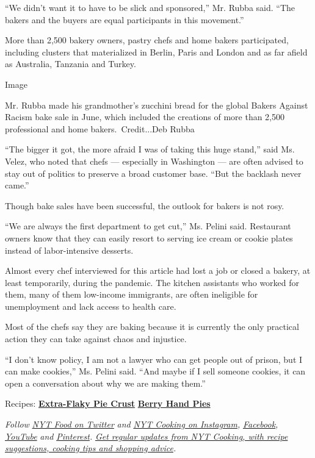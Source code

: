 ``We didn't want it to have to be slick and sponsored,'' Mr. Rubba said.
``The bakers and the buyers are equal participants in this movement.''

More than 2,500 bakery owners, pastry chefs and home bakers
participated, including clusters that materialized in Berlin, Paris and
London and as far afield as Australia, Tanzania and Turkey.

Image

Mr. Rubba made his grandmother's zucchini bread for the global Bakers
Against Racism bake sale in June, which included the creations of more
than 2,500 professional and home bakers.~Credit...Deb Rubba

``The bigger it got, the more afraid I was of taking this huge stand,''
said Ms. Velez, who noted that chefs --- especially in Washington ---
are often advised to stay out of politics to preserve a broad customer
base. ``But the backlash never came.''

Though bake sales have been successful, the outlook for bakers is not
rosy.

``We are always the first department to get cut,'' Ms. Pelini said.
Restaurant owners know that they can easily resort to serving ice cream
or cookie plates instead of labor-intensive desserts.

Almost every chef interviewed for this article had lost a job or closed
a bakery, at least temporarily, during the pandemic. The kitchen
assistants who worked for them, many of them low-income immigrants, are
often ineligible for unemployment and lack access to health care.

Most of the chefs say they are baking because it is currently the only
practical action they can take against chaos and injustice.

``I don't know policy, I am not a lawyer who can get people out of
prison, but I can make cookies,'' Ms. Pelini said. ``And maybe if I sell
someone cookies, it can open a conversation about why we are making
them.''

Recipes:
\textbf{\href{https://cooking.nytimes3xbfgragh.onion/recipes/1021241-extra-flaky-pie-crust}{Extra-Flaky
Pie Crust}} \textbar{}
\textbf{\href{https://cooking.nytimes3xbfgragh.onion/recipes/1021240-berry-hand-pies}{Berry
Hand Pies}}

\emph{Follow} \href{https://twitter.com/nytfood}{\emph{NYT Food on
Twitter}} \emph{and}
\href{https://www.instagram.com/nytcooking/}{\emph{NYT Cooking on
Instagram}}\emph{,}
\href{https://www.facebookcorewwwi.onion/nytcooking/}{\emph{Facebook}}\emph{,}
\href{https://www.youtube.com/nytcooking}{\emph{YouTube}} \emph{and}
\href{https://www.pinterest.com/nytcooking/}{\emph{Pinterest}}\emph{.}
\href{https://www.nytimes3xbfgragh.onion/newsletters/cooking}{\emph{Get
regular updates from NYT Cooking, with recipe suggestions, cooking tips
and shopping advice}}\emph{.}

